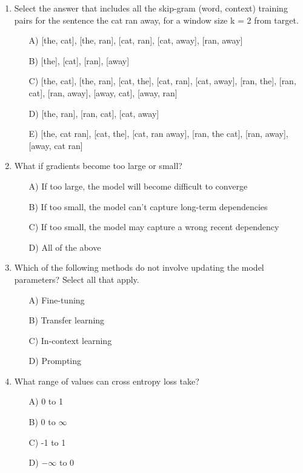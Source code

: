\documentclass[10pt]{article}
\begin{document}
\begin{enumerate}
    \item Select the answer that includes all the skip-gram (word, context) training pairs for the sentence the cat ran away, for a window size k = 2 from target.
    \begin{itemize}
        \item[A)] [the, cat], [the, ran], [cat, ran], [cat, away], [ran, away]
        \item[B)]  [the], [cat], [ran], [away]
        \item[C)] [the, cat], [the, ran], [cat, the], [cat, ran], [cat, away], [ran, the], [ran, cat], [ran, away], [away, cat], [away, ran]
        \item[D)] [the, ran], [ran, cat], [cat, away]
        \item[E)] [the, cat ran], [cat, the], [cat, ran away], [ran, the cat], [ran, away], [away, cat ran]
    \end{itemize}

    \item What if gradients become too large or small?
    \begin{itemize}
        \item[A)] If too large, the model will become difficult to converge 
        \item[B)] If too small, the model can’t capture long-term dependencies 
        \item[C)] If too small, the model may capture a wrong recent dependency 
        \item[D)] All of the above
    \end{itemize}

    \item Which of the following methods do not involve updating the model parameters? Select all that apply.
    \begin{itemize}
        \item[A)] Fine-tuning
        \item[B)] Transfer learning
        \item[C)] In-context learning
        \item[D)] Prompting
    \end{itemize}

    \item What range of values can cross entropy loss take?
    \begin{itemize}
        \item[A)] 0 to 1
        \item[B)] 0 to $\infty$
        \item[C)] -1 to 1
        \item[D)] $-\infty$ to 0
    \end{itemize}
    

\end{enumerate}
\end{document}
